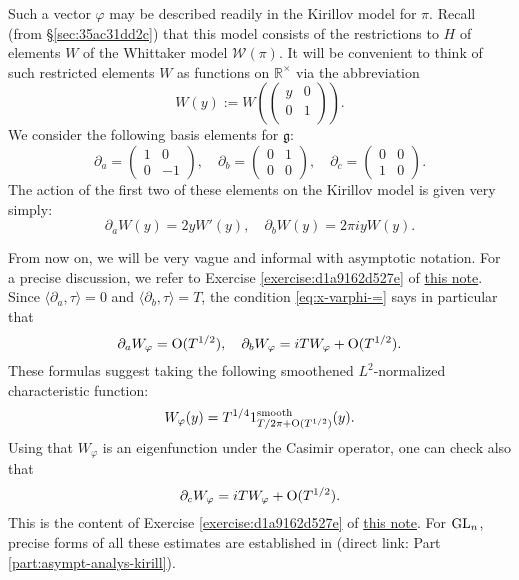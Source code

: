 \documentclass[reqno]{amsart} 
\numberwithin{equation}{section}
\begin{document}
Such a vector $\varphi$ may be described readily in the Kirillov model for $\pi$.  Recall (from \S\ref{sec:35ac31dd2c}) that this model consists of the restrictions to $H$ of elements $W$ of the Whittaker model $\mathcal{W}(\pi)$.  It will be convenient to think of such restricted elements $W$ as functions on $\mathbb{R}^\times$ via the abbreviation
\begin{equation*}
W(y) := W\left(
  \begin{pmatrix}
y & 0 \\
0 & 1 \\
\end{pmatrix} \right).
\end{equation*}
We consider the following basis elements for $\mathfrak{g}$:
\begin{equation*}
  \partial_a =
  \begin{pmatrix}
    1 & 0 \\
    0 & -1
  \end{pmatrix},
  \quad
  \partial_b =
  \begin{pmatrix}
    0 & 1 \\
    0 & 0
  \end{pmatrix},
  \quad
  \partial_c =
  \begin{pmatrix}
    0 & 0 \\
    1 & 0
  \end{pmatrix}  .
\end{equation*}
The action of the first two of these elements on the Kirillov model is given very simply:
\begin{equation*}
  \partial_a W(y) = 2 y W'(y),
  \quad
  \partial_b W(y) = 2 \pi i y W(y).
\end{equation*}

From now on, we will be very vague and informal with asymptotic notation.  For a precise discussion, we refer to Exercise \ref{exercise:d1a9162d527e} of \href{20230524T094424__exercises-localized-vectors.tex.pdf}{this note}.  Since $\langle \partial_a, \tau \rangle = 0$ and $\langle \partial_b, \tau \rangle = T$, the condition \eqref{eq:x-varphi-=} says in particular that
\begin{equation*}
  \partial_a W_\varphi = \operatorname{O}(T^{1/2}),
  \quad
  \partial_b W_\varphi = i T W_\varphi + \operatorname{O}(T^{1/2}).
\end{equation*}
These formulas suggest taking the following smoothened $L^2$-normalized characteristic function:
\begin{equation}\label{eqn:35ac3e31cb}
  W_\varphi(y) = T^{1/4} 1_{T / 2 \pi + \operatorname{O}(T^{1/2})}^{\text{smooth}}(y).
\end{equation}
Using that $W_\varphi$ is an eigenfunction under the Casimir operator, one can check also that
\begin{equation*}
  \partial_c W_\varphi = i T W_\varphi + \operatorname{O}(T^{1/2}).
\end{equation*}
This is the content of Exercise \ref{exercise:d1a9162d527e} of \href{20230524T094424__exercises-localized-vectors.tex.pdf}{this note}.  For $\operatorname{GL}_n$,  precise forms of all these estimates are established in \cite[Part 3]{2021arXiv210915230N} (direct link: Part \ref{part:asympt-analys-kirill}).
\end{document}

